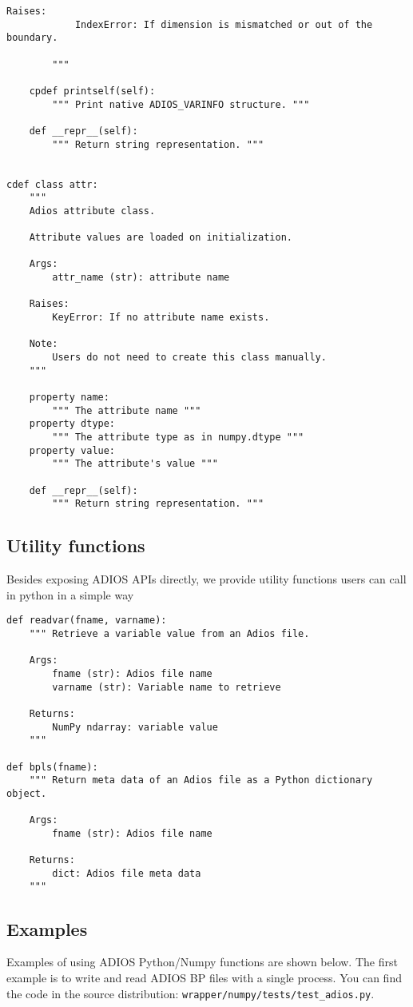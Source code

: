 \begin{lstlisting}[language=cython,caption={Read functions},label={},]
        Raises:
            IndexError: If dimension is mismatched or out of the boundary.

        """

    cpdef printself(self):
        """ Print native ADIOS_VARINFO structure. """

    def __repr__(self):
        """ Return string representation. """
        

cdef class attr:
    """
    Adios attribute class.
    
    Attribute values are loaded on initialization.

    Args:
        attr_name (str): attribute name

    Raises:
        KeyError: If no attribute name exists.

    Note:
        Users do not need to create this class manually.        
    """

    property name:
        """ The attribute name """
    property dtype:
        """ The attribute type as in numpy.dtype """
    property value:
        """ The attribute's value """

    def __repr__(self):
        """ Return string representation. """
\end{lstlisting}

\subsection{Utility functions}
Besides exposing ADIOS APIs directly, we provide utility functions users can call in python in a simple way

\begin{lstlisting}[language=cython,caption={Utility functions},label={},]
def readvar(fname, varname):
    """ Retrieve a variable value from an Adios file.

    Args:
        fname (str): Adios file name
        varname (str): Variable name to retrieve

    Returns:
        NumPy ndarray: variable value
    """

def bpls(fname):
    """ Return meta data of an Adios file as a Python dictionary object.

    Args:
        fname (str): Adios file name

    Returns:
        dict: Adios file meta data
    """
\end{lstlisting}

\subsection{Examples}
Examples of using ADIOS Python/Numpy functions are shown below. The first example is to write and read ADIOS BP files with a single process. You can find the code in the source distribution: \verb+wrapper/numpy/tests/test_adios.py+.

